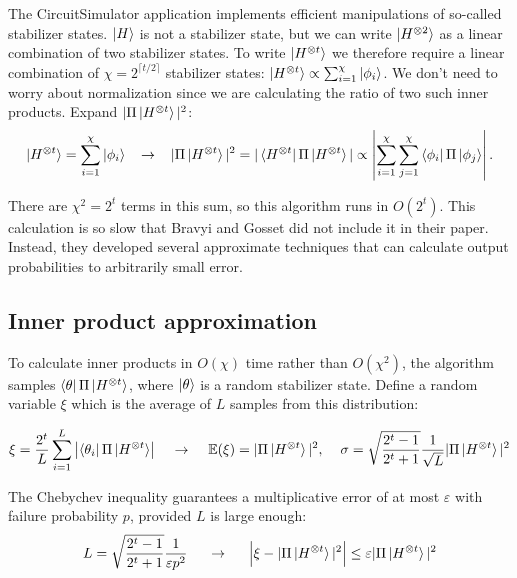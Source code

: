 \documentclass[11pt]{article}
\begin{document}
The CircuitSimulator application implements efficient manipulations of so-called stabilizer states. $\ket{H}$ is not a stabilizer state, but we can write $\ket{H^{\otimes 2}}$ as a linear combination of two stabilizer states. To write $\ket{H^{\otimes t}}$ we therefore require a linear combination of $\chi = 2^{\lceil t/2\rceil}$ stabilizer states: $\ket{H^{\otimes t}} \propto \sum_{i=1}^\chi \ket{\phi_i}$.  We don't need to worry about normalization since we are calculating the ratio of two such inner products. Expand $|\Pi\ket{H^{\otimes t}}|^2$:
$$\ket{H^{\otimes t}} = \sum^\chi_{i=1} \ket{\phi_i} \hspace{3mm} \to \hspace{3mm} |\Pi\ket{H^{\otimes t}}|^2 = |\bra{H^{\otimes t}}\Pi\ket{H^{\otimes t}}| \propto \left| \sum^\chi_{i=1} \sum^\chi_{j=1}\bra{\phi_i}\Pi\ket{\phi_j}\right|.\label{eq:decomp}$$

There are $\chi^2 = 2^t$ terms in this sum, so this algorithm runs in $O(2^t)$. This calculation is so slow that Bravyi and Gosset did not include it in their paper. Instead, they developed several approximate techniques that can calculate output probabilities to arbitrarily small error.


\subsection{Inner product approximation} \label{sec:ipa}

To calculate inner products in $O(\chi)$ time rather than $O(\chi^2)$, the algorithm samples $\bra{\theta}\Pi\ket{H^{\otimes t}}$, where $\ket{\theta}$ is a random stabilizer state. Define a random variable $\xi$ which is the average of $L$ samples from this distribution:

$$\xi = \frac{2^t}{L} \sum_{i=1}^L \left| \bra{\theta_i} \Pi \ket{H^{\otimes t}} \right|\hspace{4mm}\to\hspace{4mm} \mathbb{E}(\xi) = | \Pi \ket{H^{\otimes t}}|^2,\hspace{4mm} \sigma = \sqrt{\frac{2^t - 1}{2^t + 1}} \frac{1}{\sqrt{L}} | \Pi \ket{H^{\otimes t}}|^2 $$

\newcommand{\eps}{\varepsilon}
The Chebychev inequality guarantees a multiplicative error of at most $\eps$ with failure probability $p$, provided $L$ is large enough:
$$ L = \sqrt{\frac{2^t - 1}{2^t + 1}} \frac{1}{\eps p^2} \hspace{0.5cm}\to \hspace{0.5cm} \Big|\xi - |\Pi\ket{H^{\otimes t}}|^2 \Big| \leq \eps |\Pi\ket{H^{\otimes t}}|^2 $$
\end{document}
